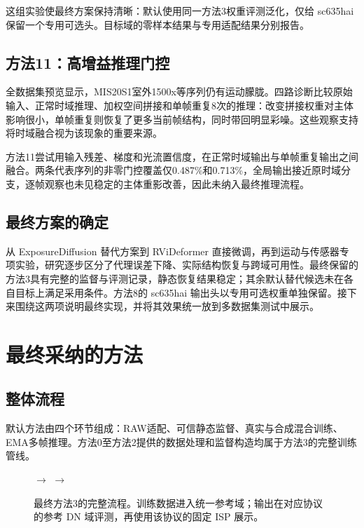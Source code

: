 \documentclass[11pt,a4paper,UTF8,fontset=fandol]{ctexart}
\begin{document}
这组实验使最终方案保持清晰：默认使用同一方法3权重评测泛化，仅给 sc635hai 保留一个专用可选头。目标域的零样本结果与专用适配结果分别报告。

\subsection{方法11：高增益推理门控}

全数据集预览显示，MIS20S1室外1500x等序列仍有运动朦胧。四路诊断比较原始输入、正常时域推理、加权空间拼接和单帧重复8次的推理：改变拼接权重对主体影响很小，单帧重复则恢复了更多当前帧结构，同时带回明显彩噪。这些观察支持将时域融合视为该现象的重要来源。

方法11尝试用输入残差、梯度和光流置信度，在正常时域输出与单帧重复输出之间融合。两条代表序列的非零门控覆盖仅0.487\%和0.713\%，全局输出接近原时域分支，逐帧观察也未见稳定的主体重影改善，因此未纳入最终推理流程。

\subsection{最终方案的确定}

从 ExposureDiffusion 替代方案到 RViDeformer 直接微调，再到运动与传感器专项实验，研究逐步区分了代理误差下降、实际结构恢复与跨域可用性。最终保留的方法3具有完整的监督与评测记录，静态恢复结果稳定；其余默认替代候选未在各自目标上满足采用条件。方法8的 sc635hai 输出头以专用可选权重单独保留。接下来围绕这两项说明最终实现，并将其效果统一放到多数据集测试中展示。

\section{最终采纳的方法}
\label{sec:adopted}

\subsection{整体流程}

默认方法由四个环节组成：RAW适配、可信静态监督、真实与合成混合训练、EMA多帧推理。方法0至方法2提供的数据处理和监督构造均属于方法3的完整训练管线。

\begin{figure}[H]
\centering\small
{}
$\longrightarrow$
$\longrightarrow$
\caption{最终方法3的完整流程。训练数据进入统一参考域；输出在对应协议的参考 DN 域评测，再使用该协议的固定 ISP 展示。}
\label{fig:adopted_pipeline}
\end{figure}
\end{document}
